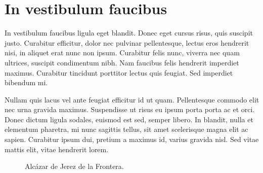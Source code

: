 \section{In vestibulum faucibus}

In vestibulum faucibus ligula eget blandit. Donec eget cursus risus, quis suscipit justo. Curabitur efficitur, dolor nec pulvinar pellentesque, lectus eros hendrerit nisi, in aliquet erat nunc non ipsum. Curabitur felis nunc, viverra nec quam ultrices, suscipit condimentum nibh. Nam faucibus felis hendrerit imperdiet maximus. Curabitur tincidunt porttitor lectus quis feugiat. Sed imperdiet bibendum mi.

Nullam quis lacus vel ante feugiat efficitur id ut quam. Pellentesque commodo elit nec urna gravida maximus. Suspendisse ut risus eu ipsum porta porta ac et orci. Donec dictum ligula sodales, euismod est sed, semper libero. In blandit, nulla et elementum pharetra, mi nunc sagittis tellus, sit amet scelerisque magna elit ac sapien. Curabitur ipsum dui, pretium a maximus id, varius gravida nisl. Sed vitae mattis elit, vitae hendrerit lorem. 


\begin{figure}
    \centering
    \hfill
    
    \caption{Alcázar de Jerez de la Frontera.}
    \label{fig:cha1:jerez}
\end{figure}


